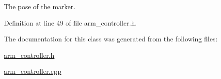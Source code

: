 The pose of the marker. 



Definition at line 49 of file arm\+\_\+controller.\+h.



The documentation for this class was generated from the following files\+:\begin{DoxyCompactItemize}
\item 
\hyperlink{arm__controller_8h}{arm\+\_\+controller.\+h}\item 
\hyperlink{arm__controller_8cpp}{arm\+\_\+controller.\+cpp}\end{DoxyCompactItemize}
